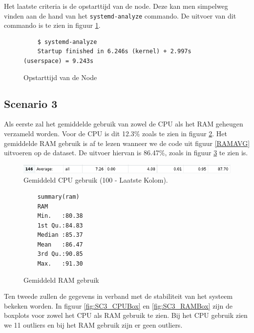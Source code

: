Het laatste criteria is de opstarttijd van de node. Deze kan men simpelweg vinden aan de hand van het \verb|systemd-analyze| commando. De uitvoer van dit commando is te zien in figuur \ref{SC2_StartTime}.

\begin{figure}[h]
	\centering
	\begin{verbatim} 
	$ systemd-analyze
	Startup finished in 6.246s (kernel) + 2.997s (userspace) = 9.243s
	\end{verbatim}
	\caption{Opstarttijd van de Node}
	\label{SC2_StartTime}
\end{figure}

\clearpage
\subsection{Scenario 3}
%

Als eerste zal het gemiddelde gebruik van zowel de CPU als het RAM geheugen verzameld worden. Voor de CPU is dit 12.3\% zoals te zien in figuur \ref{fig:SC3_CPUAVG}. Het gemiddelde RAM gebruik is af te lezen wanneer we de code uit figuur \ref{RAMAVG} uitvoeren op de dataset. De uitvoer hiervan is 86.47\%, zoals in figuur \ref{SC3_RAMAVG} te zien is.
\begin{figure}[h]
	\centering
	\includegraphics[width=\linewidth]{img/SC3_CPUAVG.png}
	\caption{Gemiddeld CPU gebruik (100 - Laatste Kolom).}
	\label{fig:SC3_CPUAVG}
\end{figure}
\begin{figure}[h]
	\centering
	\begin{verbatim} 
	summary(ram)
	RAM       
	Min.   :80.38  
	1st Qu.:84.83  
	Median :85.37  
	Mean   :86.47  
	3rd Qu.:90.85  
	Max.   :91.30  
	\end{verbatim}
	\caption{Gemiddeld RAM gebruik}
	\label{SC3_RAMAVG}
\end{figure}

Ten tweede zullen de gegevens in verband met de stabiliteit van het systeem bekeken worden. In figuur \ref{fig:SC3_CPUBox} en \ref{fig:SC3_RAMBox} zijn de boxplots voor zowel het CPU als RAM gebruik te zien. Bij het CPU gebruik zien we 11 outliers en bij het RAM gebruik zijn er geen outliers.

